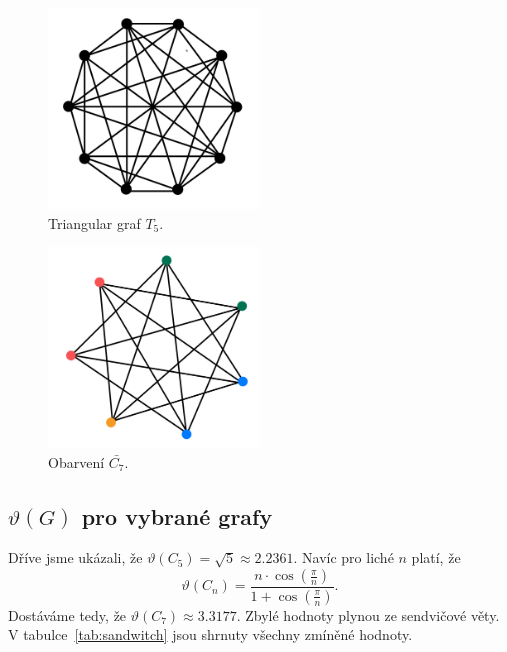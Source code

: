 \begin{figure}[h!]
    \centering
    \includegraphics[width=0.5\textwidth]{img/complement_petersen.jpeg}   
    \caption{Triangular graf $T_5$.}
    \label{fig:complement_petersen}
\end{figure}

\begin{figure}[h!]
    \centering
    \includegraphics[width=0.5\textwidth]{img/complement_c7.jpeg}   
    \caption{Obarvení $\bar{C_7}$.}
    \label{fig:complement_c7}
\end{figure}

\subsection*{$\vartheta(G)$ pro vybrané grafy}

Dříve jsme ukázali, že $\vartheta(C_5) = \sqrt{5} \approx 2.2361$. Navíc pro liché $n$ \cite{lovasz} platí, že
\begin{equation}
    \vartheta(C_n) = \frac{n \cdot \cos(\frac{\pi}{n})}{1 + \cos(\frac{\pi}{n})}.
    \label{eq:cycle_theta}
\end{equation}
Dostáváme tedy, že $\vartheta({C_7}) \approx 3.3177$. Zbylé hodnoty plynou ze sendvičové věty. V tabulce~\ref{tab:sandwitch} jsou shrnuty všechny zmíněné hodnoty.

